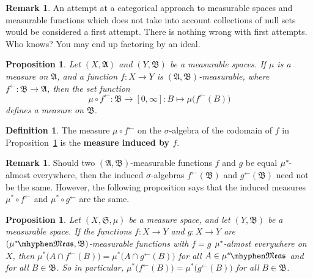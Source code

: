 \documentclass[
twoside=true,
paper=letter,
fontsize=9pt,
pagesize=auto,
leqno,
openany,
headsepline,
overfullrule,
]{scrbook}
\theoremstyle{plain}
\theoremstyle{plain}
\newtheorem{prop}[thm]{Proposition}
\theoremstyle{definition}
\newtheorem{defn}[thm]{Definition}
\newtheorem{rmk}[thm]{Remark}
\theoremstyle{bfnoteitalic}
\theoremstyle{bfnoteroman}
\newcommand{\sigalg}[1]{\mathfrak{#1}}
\newcommand{\textsigma}{\hbox{\large{$\sigma$}}\kern-1pt}
\newcommand{\preimage}[1]{#1^{\leftarrow}}
\newcommand{\meets}{\cap}
\newcommand{\semiring}{\sigalg{S}}
\newcommand{\sigmaalgebra}{\sigalg{A}}
\newcommand{\sigmaalgebraii}{\sigalg{B}}
\newcommand{\measurable}[1]{{#1}\mhyphen\mathfrak{Meas}}
\newcommand{\kernast}{\ast\kern-1pt}
\newcommand{\function}{f}
\newcommand{\measurespace}{X}
\newcommand{\measurespaceii}{Y}
\newcommand{\measure}{\mu}
\begin{document}
\begin{rmk}
An attempt at a categorical approach to measurable spaces and measurable functions which does not take into account collections of null sets would be considered a first attempt.  There is nothing wrong with first attempts. Who knows? You may end up factoring by an ideal.
\end{rmk}





\begin{prop}\label{function_induces_measure}
Let $(\measurespace,\sigmaalgebra)$  and  $(\measurespaceii, \sigmaalgebraii)$ be a measurable spaces.  
If $\measure$ is a measure on $\sigmaalgebra$, and a function $f:\measurespace\to\measurespaceii$ is 
$(\sigmaalgebra, \sigmaalgebraii)$\hyp{}measurable, where $\preimage{f}:\sigmaalgebraii\to\sigmaalgebra$,
then the set function
\[
\measure\circ\preimage{f} 
: \sigmaalgebraii\to [0,\infty] 
: B\mapsto \measure\bigl(\preimage{f}(B)\bigr)
\]
defines a measure on $\sigmaalgebraii$.
\end{prop}


\begin{defn}\label{induced_measure}
The measure $\measure\circ\preimage{\function}$ on the \textsigma-algebra of the codomain of $\function$ in Proposition~\ref{function_induces_measure} is the \textbf{measure induced by $\function$}.
\end{defn}



\begin{rmk} 
Should two $(\sigmaalgebra, \sigmaalgebraii)$\hyp{}measurable functions $f$ and $g$ be equal $\measure^\kernast$-almost everywhere, then the induced \textsigma-algebras $\preimage{f}(\sigmaalgebraii)$ and $\preimage{g}(\sigmaalgebraii)$  need not be the same. However, the following proposition says that the induced measures 
$\measure^*\circ \preimage{f}$ and $\measure^*\circ\preimage{g}$ are the same. 
\end{rmk}


\begin{prop}\label{class_induces_measure}
Let $(\measurespace,\semiring,\measure)$ be a measure space, and let $(\measurespaceii, \sigmaalgebraii)$ be a measurable space.  If  the functions 
$f:\measurespace\to\measurespaceii$ 
and
$g:\measurespace\to\measurespaceii$ 
are $(\measurable{\measure^\kernast}, \sigmaalgebraii)$\hyp{}measurable functions with 
$f = g$ $\measure^\kernast$-almost everywhere on $\measurespace$, then 
$\measure^*\bigl(A\meets \preimage{f}(B)\bigr) 
= 
\measure^*\bigl(A\meets \preimage{g}(B)\bigr)$ for all
$A\in \measurable{\measure^\kernast}$ and for all $B\in\sigmaalgebraii$.
So in particular,
$\measure^*\bigl(\preimage{f}(B)\bigr) 
= 
\measure^*\bigl(\preimage{g}(B)\bigr)$ for all
$B\in\sigmaalgebraii$.
\end{prop}
\end{document}
